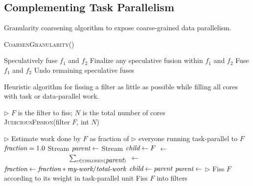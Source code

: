 \subsection{Complementing Task Parallelism}

\begin{algorithm}[t]
\caption{Granularity coarsening algorithm to expose coarse-grained
data parallelism. \label{fig:coarsening-code}}
\textsc{CoarsenGranularity}()
\begin{algorithmic}
\Repeat
			\State Speculatively fuse $f_1$ and $f_2$
			\State Finalize any speculative fusion within
$f_1$ and $f_2$
			\State Fuse $f_1$ and $f_2$
		\EndIf
	\EndFor
{}
\State Undo remaining speculative fuses	
\end{algorithmic}
\end{algorithm}

\begin{algorithm}[t]
\caption{Heuristic algorithm for fissing a filter as little as
possible while filling all cores with task or data-parallel
work. \label{fig:judicious-fission}}
{$\triangleright$ $F$ is the filter to fiss; $N$ is the total number of cores\\
\textsc{JudiciousFission}(filter $F$, int $N$)}
\begin{algorithmic}
\Statex $\triangleright$ Estimate work done by $F$ as fraction of
\Statex $\triangleright$ everyone running task-parallel to $F$
\State $\mbox{\it fraction} = 1.0$
\State Stream $\mbox{\it parent} \gets$ 
\State Stream $\mbox{\it child}  \gets F$
		\State {} $\gets$ \\
\ \ \ \ \ \ \ \ \ \ \ \ \ \  \ \ \ \ \  $\sum_{c \in \textsc{children}(\mbox{\it parent})}$ 
		\State {} $ \gets $ 
		\State $\mbox{\it fraction} \gets \mbox{\it fraction} * \mbox{\it my-work} /
\mbox{\it total-work}$
	\EndIf
	\State $\mbox{\it child} \gets \mbox{\it parent}$
	\State $\mbox{\it parent} \gets $ 
\EndWhile
\Statex $\triangleright$ Fiss $F$ according to its weight in task-parallel unit
\State Fiss $F$ into  filters
\end{algorithmic}
\end{algorithm}

